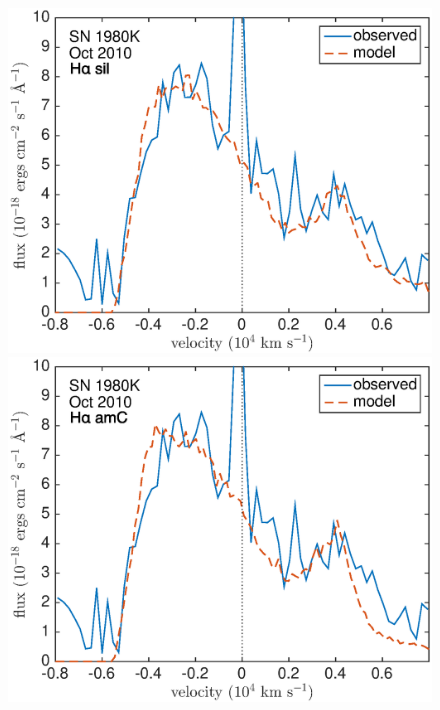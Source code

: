 {\begin{figure}[!t]
\centering
\includegraphics[scale=0.4,clip=true, trim=20 0 40 20]{chapters/chapter6/figs/80K/smooth/Ha}
\includegraphics[scale=0.4,clip=true, trim=20 0 40 20]{chapters/chapter6/figs/80K/smooth/Ha_amC}


\end{figure}}
